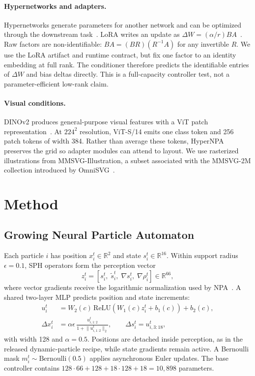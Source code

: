 \documentclass[sigconf,nonacm]{acmart}
\begin{document}
\paragraph{Hypernetworks and adapters.}
Hypernetworks generate parameters for another network and can be optimized
through the downstream task~\cite{ha2016hypernetworks}. LoRA writes an update
as $\Delta W=(\alpha/r)BA$~\cite{hu2021lora}. Raw factors are non-identifiable:
$BA=(BR)(R^{-1}A)$ for any invertible $R$. We use the LoRA artifact and runtime
contract, but fix one factor to an identity embedding at full rank. The
conditioner therefore predicts the identifiable entries of $\Delta W$ and
bias deltas directly. This is a full-capacity controller test, not a
parameter-efficient low-rank claim.

\paragraph{Visual conditions.}
DINOv2 produces general-purpose visual features with a ViT patch
representation~\cite{oquab2024dinov2}. At $224^2$ resolution, ViT-S/14 emits
one class token and 256 patch tokens of width 384. Rather than average these
tokens, HyperNPA preserves the grid so adapter modules can attend to layout.
We use rasterized illustrations from MMSVG-Illustration, a subset associated
with the MMSVG-2M collection introduced by OmniSVG~\cite{yang2025omnisvg}.

\section{Method}

\subsection{Growing Neural Particle Automaton}

Each particle $i$ has position $x_i^t\in\mathbb{R}^2$ and state
$s_i^t\in\mathbb{R}^{16}$. Within support radius $\epsilon=0.1$, SPH operators
form the perception vector
\begin{equation}
z_i^t=\left[s_i^t,\;\widetilde{s}_i^t,\;\nabla s_i^t,\;\nabla\rho_i^t\right]
\in\mathbb{R}^{66},
\label{eq:perception}
\end{equation}
where vector gradients receive the logarithmic normalization used by
NPA~\cite{kim2026npa}. A shared two-layer MLP predicts position and state
increments:
\begin{align}
u_i^t &= W_2(c)\,\mathrm{ReLU}\!\left(W_1(c)z_i^t+b_1(c)\right)+b_2(c),\\
\Delta x_i^t &= \alpha\epsilon\,
  \frac{u_{i,1:2}^t}{1+\lVert u_{i,1:2}^t\rVert_2},\qquad
\Delta s_i^t=u_{i,3:18}^t,
\end{align}
with width 128 and $\alpha=0.5$. Positions are detached inside perception, as
in the released dynamic-particle recipe, while state gradients remain active.
A Bernoulli mask $m_i^t\sim\mathrm{Bernoulli}(0.5)$ applies asynchronous Euler
updates. The base controller contains
$128\cdot66+128+18\cdot128+18=10{,}898$ parameters.
\end{document}
